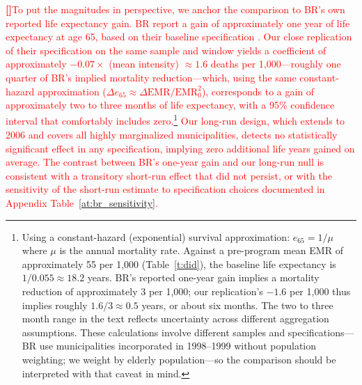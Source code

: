 \documentclass[12pt]{article}
\newcounter{paragraphnum}
\newcommand{\p}{\refstepcounter{paragraphnum}\textbf{[\theparagraphnum]}\enspace}
\begin{document}
\textcolor{red}{\p To put the magnitudes in perspective, we anchor the comparison to BR's own reported life expectancy gain. BR report a gain of approximately one year of life expectancy at age 65, based on their baseline specification \citep{BarhamRowberry2013JDE}. Our close replication of their specification on the same sample and window yields a coefficient of approximately $-0.07 \times$ (mean intensity) $\approx 1.6$ deaths per 1,000—roughly one quarter of BR's implied mortality reduction—which, using the same constant-hazard approximation ($\Delta e_{65} \approx \Delta \text{EMR} / \text{EMR}_0^2$), corresponds to a gain of approximately two to three months of life expectancy, with a 95\% confidence interval that comfortably includes zero.\footnote{Using a constant-hazard (exponential) survival approximation: $e_{65} = 1/\mu$ where $\mu$ is the annual mortality rate. Against a pre-program mean EMR of approximately 55 per 1,000 (Table~\ref{t:did}), the baseline life expectancy is $1/0.055 \approx 18.2$ years. BR's reported one-year gain implies a mortality reduction of approximately 3 per 1,000; our replication's $-1.6$ per 1,000 thus implies roughly $1.6/3 \approx 0.5$ years, or about six months. The two to three month range in the text reflects uncertainty across different aggregation assumptions. These calculations involve different samples and specifications—BR use municipalities incorporated in 1998--1999 without population weighting; we weight by elderly population—so the comparison should be interpreted with that caveat in mind.} Our long-run design, which extends to 2006 and covers all highly marginalized municipalities, detects no statistically significant effect in any specification, implying zero additional life years gained on average. The contrast between BR's one-year gain and our long-run null is consistent with a transitory short-run effect that did not persist, or with the sensitivity of the short-run estimate to specification choices documented in Appendix Table~\ref{at:br_sensitivity}.}



\end{document}

